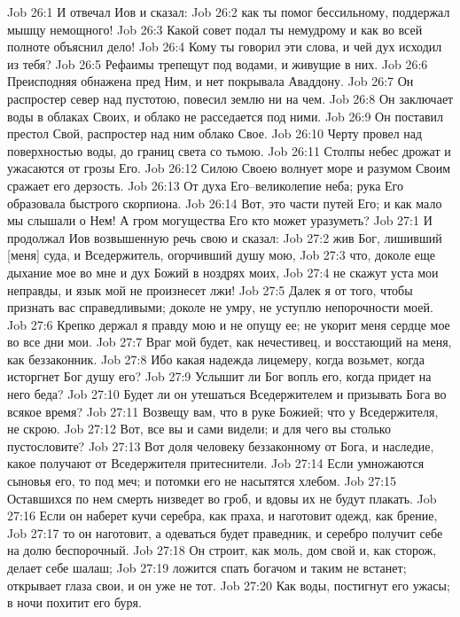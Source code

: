 Job 26:1  И отвечал Иов и сказал:
Job 26:2  как ты помог бессильному, поддержал мышцу немощного!
Job 26:3  Какой совет подал ты немудрому и как во всей полноте объяснил дело!
Job 26:4  Кому ты говорил эти слова, и чей дух исходил из тебя?
Job 26:5  Рефаимы трепещут под водами, и живущие в них.
Job 26:6  Преисподняя обнажена пред Ним, и нет покрывала Аваддону.
Job 26:7  Он распростер север над пустотою, повесил землю ни на чем.
Job 26:8  Он заключает воды в облаках Своих, и облако не расседается под ними.
Job 26:9  Он поставил престол Свой, распростер над ним облако Свое.
Job 26:10  Черту провел над поверхностью воды, до границ света со тьмою.
Job 26:11  Столпы небес дрожат и ужасаются от грозы Его.
Job 26:12  Силою Своею волнует море и разумом Своим сражает его дерзость.
Job 26:13  От духа Его--великолепие неба; рука Его образовала быстрого скорпиона.
Job 26:14  Вот, это части путей Его; и как мало мы слышали о Нем! А гром могущества Его кто может уразуметь?
Job 27:1  И продолжал Иов возвышенную речь свою и сказал:
Job 27:2  жив Бог, лишивший [меня] суда, и Вседержитель, огорчивший душу мою,
Job 27:3  что, доколе еще дыхание мое во мне и дух Божий в ноздрях моих,
Job 27:4  не скажут уста мои неправды, и язык мой не произнесет лжи!
Job 27:5  Далек я от того, чтобы признать вас справедливыми; доколе не умру, не уступлю непорочности моей.
Job 27:6  Крепко держал я правду мою и не опущу ее; не укорит меня сердце мое во все дни мои.
Job 27:7  Враг мой будет, как нечестивец, и восстающий на меня, как беззаконник.
Job 27:8  Ибо какая надежда лицемеру, когда возьмет, когда исторгнет Бог душу его?
Job 27:9  Услышит ли Бог вопль его, когда придет на него беда?
Job 27:10  Будет ли он утешаться Вседержителем и призывать Бога во всякое время?
Job 27:11  Возвещу вам, что в руке Божией; что у Вседержителя, не скрою.
Job 27:12  Вот, все вы и сами видели; и для чего вы столько пустословите?
Job 27:13  Вот доля человеку беззаконному от Бога, и наследие, какое получают от Вседержителя притеснители.
Job 27:14  Если умножаются сыновья его, то под меч; и потомки его не насытятся хлебом.
Job 27:15  Оставшихся по нем смерть низведет во гроб, и вдовы их не будут плакать.
Job 27:16  Если он наберет кучи серебра, как праха, и наготовит одежд, как брение,
Job 27:17  то он наготовит, а одеваться будет праведник, и серебро получит себе на долю беспорочный.
Job 27:18  Он строит, как моль, дом свой и, как сторож, делает себе шалаш;
Job 27:19  ложится спать богачом и таким не встанет; открывает глаза свои, и он уже не тот.
Job 27:20  Как воды, постигнут его ужасы; в ночи похитит его буря.
